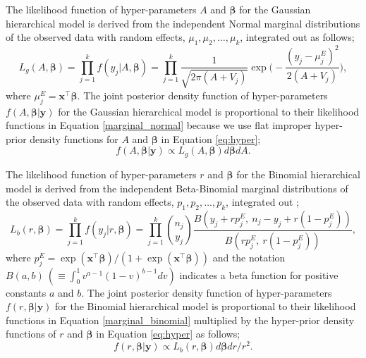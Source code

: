 \documentclass[article]{jss}
\begin{document}
The likelihood function of hyper-parameters $A$ and $\boldsymbol{\beta}$ for the Gaussian hierarchical model is derived from the independent Normal marginal distributions of the observed data with random effects, $\mu_1, \mu_2, \ldots, \mu_k$, integrated out as follows; %
\begin{equation}\label{marginal_normal}
L_g(A, \boldsymbol{\boldsymbol{\beta}})=\prod_{j=1}^k f(y_j\vert A, \boldsymbol{\boldsymbol{\beta}})=\prod_{j=1}^k \frac{1}{\sqrt{2\pi (A+V_j)}}\exp\big(-\frac{(y_j-\mu^E_j)^2}{2(A+V_j)}\big),
\end{equation}
where $\mu^E_j=\boldsymbol{x}^\top\boldsymbol{\beta}$. The joint posterior density  function of hyper-parameters $f(A, \boldsymbol{\boldsymbol{\beta}}\vert \boldsymbol{y})$ for the Gaussian hierarchical model is proportional to their likelihood functions in Equation \ref{marginal_normal} because we use flat improper hyper-prior density functions for $A$ and $\boldsymbol{\beta}$ in Equation \ref{eq:hyper};
\begin{equation}\label{marginal_post_normal}
f(A, \boldsymbol{\boldsymbol{\beta}}\vert \boldsymbol{y})\propto L_g(A, \boldsymbol{\boldsymbol{\beta}})d\boldsymbol{\beta}dA.
\end{equation}


The likelihood function of hyper-parameters $r$ and $\boldsymbol{\beta}$ for the Binomial hierarchical model is derived from the independent Beta-Binomial marginal distributions of the observed data with random effects, $p_1, p_2, \ldots, p_k$, integrated out \citep{skellam1948}; %
\begin{equation}\label{marginal_binomial}
L_b(r, \boldsymbol{\boldsymbol{\beta}})=\prod_{j=1}^k f(y_j\vert r, \boldsymbol{\boldsymbol{\beta}})=\prod_{j=1}^k\binom{n_j}{y_j}\frac{B(y_j+rp^E_j, ~n_j-y_j+r(1-p^E_j))}{B(rp^E_j, ~r(1-p^E_j))},
\end{equation}
where $p^E_j=\exp(\boldsymbol{x}^\top\boldsymbol{\beta})/(1+\exp(\boldsymbol{x}^\top\boldsymbol{\beta}))$ and the notation $B(a, b)~(\equiv\int_0^1 v^{a-1}(1-v)^{b-1}dv)$ indicates a beta function for positive constants $a$ and $b$. The joint posterior density  function of hyper-parameters $f(r, \boldsymbol{\boldsymbol{\beta}}\vert \boldsymbol{y})$ for the Binomial hierarchical model is proportional to their likelihood functions in Equation \ref{marginal_binomial} multiplied by the hyper-prior density functions of $r$ and $\boldsymbol{\beta}$ in Equation \ref{eq:hyper} as follows;
\begin{equation}\label{marginal_post_binomial}
f(r, \boldsymbol{\boldsymbol{\beta}}\vert \boldsymbol{y})\propto L_b(r, \boldsymbol{\boldsymbol{\beta}})d\boldsymbol{\beta}dr/r^2.
\end{equation}
\end{document}
